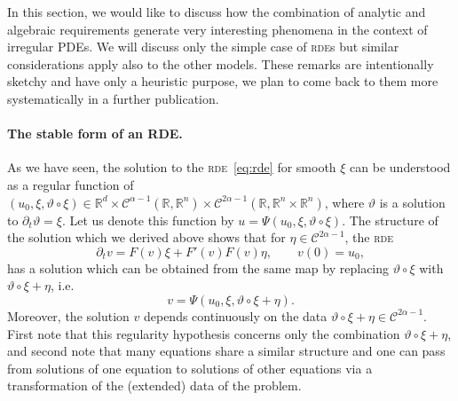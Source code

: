 \documentclass[11pt,a4paper]{article}
\theoremstyle{remark}
\newcommand{\R}{\mathbb{R}}
\newcommand{\CC}{\ensuremath{\mathscr{C}}}
\begin{document}
In this section, we would like to discuss how the combination of analytic and algebraic requirements generate very interesting phenomena in the context of irregular PDEs. We will discuss only the simple case of \textsc{rde}s but similar considerations apply also to the other models. These remarks are intentionally sketchy and have only a heuristic purpose, we plan to come back to them more systematically in a further publication.

\paragraph{The stable form of an RDE.}
As we have seen, the solution to the \textsc{rde}~{\eqref{eq:rde}} for smooth $\xi$ can
be understood as a regular function of $(u_0, \xi , \vartheta \circ   \xi ) \in \R^d \times \CC^{\alpha -1} ( \mathbb{R},\mathbb{R}^{n} ) \times \CC^{2 \alpha -1} (\mathbb{R},\mathbb{R}^{n} \times \mathbb{R}^{n} )$, where $\vartheta$ is a
solution to $\partial_{t} \vartheta = \xi$. Let us denote this function by $u=\Psi ( u_{0} , \xi , \vartheta \circ   \xi )$. The structure of the solution
which we derived above shows that for $\eta \in \CC^{2 \alpha -1}$, the \textsc{rde}
\begin{equation}\label{eq:rde-ren}
  \partial_{t} v=F ( v ) \xi +F' ( v ) F ( v ) \eta, \qquad v(0) = u_0,
\end{equation}
has a solution which can be obtained from the same map by replacing $\vartheta \circ   \xi$ with $\vartheta \circ   \xi + \eta$, i.e.
\[
   v= \Psi ( u_{0} , \xi , \vartheta \circ   \xi + \eta ).
\]
Moreover, the solution $v$ depends continuously on the data $\vartheta \circ \xi + \eta \in \CC^{2 \alpha -1}$. First note that this regularity hypothesis
concerns only the combination $\vartheta \circ   \xi + \eta$, and second note
that many equations share a similar structure and one can pass from solutions
of one equation to solutions of other equations via a transformation of the
(extended) data of the problem.
\end{document}
